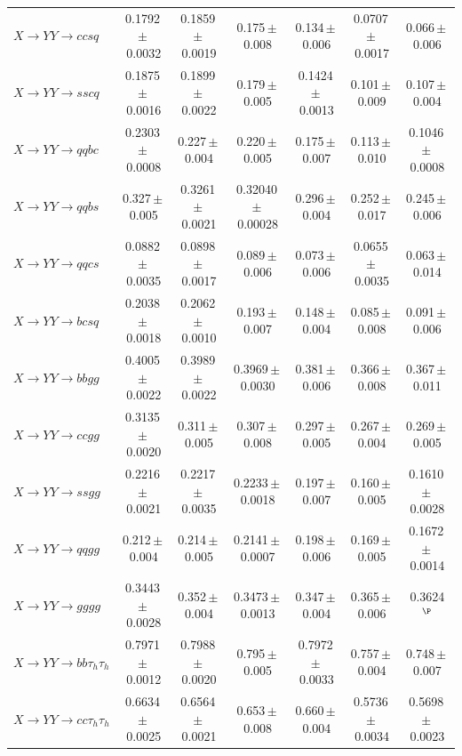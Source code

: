 \documentclass[12pt]{article}   %
\begin{document}
\begin{landscape}
{\begin{longtable}{@{\extracolsep{\fill}}lcccccc@{}}
$X\to YY\to ccsq$ & 0.1792\,$\pm$\,0.0032 & 0.1859\,$\pm$\,0.0019 & 0.175\,$\pm$\,0.008 & 0.134\,$\pm$\,0.006 & 0.0707\,$\pm$\,0.0017 & 0.066\,$\pm$\,0.006 \\
$X\to YY\to sscq$ & 0.1875\,$\pm$\,0.0016 & 0.1899\,$\pm$\,0.0022 & 0.179\,$\pm$\,0.005 & 0.1424\,$\pm$\,0.0013 & 0.101\,$\pm$\,0.009 & 0.107\,$\pm$\,0.004 \\
$X\to YY\to qqbc$ & 0.2303\,$\pm$\,0.0008 & 0.227\,$\pm$\,0.004 & 0.220\,$\pm$\,0.005 & 0.175\,$\pm$\,0.007 & 0.113\,$\pm$\,0.010 & 0.1046\,$\pm$\,0.0008 \\
$X\to YY\to qqbs$ & 0.327\,$\pm$\,0.005 & 0.3261\,$\pm$\,0.0021 & 0.32040\,$\pm$\,0.00028 & 0.296\,$\pm$\,0.004 & 0.252\,$\pm$\,0.017 & 0.245\,$\pm$\,0.006 \\
$X\to YY\to qqcs$ & 0.0882\,$\pm$\,0.0035 & 0.0898\,$\pm$\,0.0017 & 0.089\,$\pm$\,0.006 & 0.073\,$\pm$\,0.006 & 0.0655\,$\pm$\,0.0035 & 0.063\,$\pm$\,0.014 \\
$X\to YY\to bcsq$ & 0.2038\,$\pm$\,0.0018 & 0.2062\,$\pm$\,0.0010 & 0.193\,$\pm$\,0.007 & 0.148\,$\pm$\,0.004 & 0.085\,$\pm$\,0.008 & 0.091\,$\pm$\,0.006 \\
$X\to YY\to bbgg$ & 0.4005\,$\pm$\,0.0022 & 0.3989\,$\pm$\,0.0022 & 0.3969\,$\pm$\,0.0030 & 0.381\,$\pm$\,0.006 & 0.366\,$\pm$\,0.008 & 0.367\,$\pm$\,0.011 \\
$X\to YY\to ccgg$ & 0.3135\,$\pm$\,0.0020 & 0.311\,$\pm$\,0.005 & 0.307\,$\pm$\,0.008 & 0.297\,$\pm$\,0.005 & 0.267\,$\pm$\,0.004 & 0.269\,$\pm$\,0.005 \\
$X\to YY\to ssgg$ & 0.2216\,$\pm$\,0.0021 & 0.2217\,$\pm$\,0.0035 & 0.2233\,$\pm$\,0.0018 & 0.197\,$\pm$\,0.007 & 0.160\,$\pm$\,0.005 & 0.1610\,$\pm$\,0.0028 \\
$X\to YY\to qqgg$ & 0.212\,$\pm$\,0.004 & 0.214\,$\pm$\,0.005 & 0.2141\,$\pm$\,0.0007 & 0.198\,$\pm$\,0.006 & 0.169\,$\pm$\,0.005 & 0.1672\,$\pm$\,0.0014 \\
$X\to YY\to gggg$ & 0.3443\,$\pm$\,0.0028 & 0.352\,$\pm$\,0.004 & 0.3473\,$\pm$\,0.0013 & 0.347\,$\pm$\,0.004 & 0.365\,$\pm$\,0.006 & 0.3624$^{\P}$ \\
\midrule
$X\to YY\to bb\tau_h\tau_h$ & 0.7971\,$\pm$\,0.0012 & 0.7988\,$\pm$\,0.0020 & 0.795\,$\pm$\,0.005 & 0.7972\,$\pm$\,0.0033 & 0.757\,$\pm$\,0.004 & 0.748\,$\pm$\,0.007 \\
$X\to YY\to cc\tau_h\tau_h$ & 0.6634\,$\pm$\,0.0025 & 0.6564\,$\pm$\,0.0021 & 0.653\,$\pm$\,0.008 & 0.660\,$\pm$\,0.004 & 0.5736\,$\pm$\,0.0034 & 0.5698\,$\pm$\,0.0023 \\

\end{longtable}}
\end{landscape}
\end{document}
